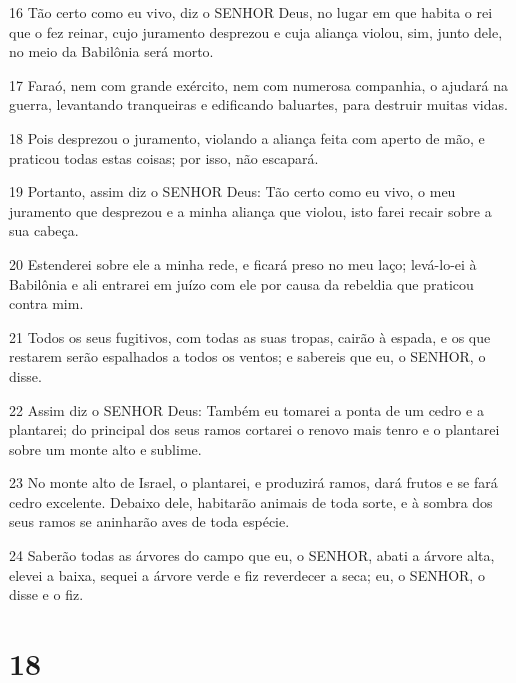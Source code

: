 \par 16 Tão certo como eu vivo, diz o SENHOR Deus, no lugar em que habita o rei que o fez reinar, cujo juramento desprezou e cuja aliança violou, sim, junto dele, no meio da Babilônia será morto.
\par 17 Faraó, nem com grande exército, nem com numerosa companhia, o ajudará na guerra, levantando tranqueiras e edificando baluartes, para destruir muitas vidas.
\par 18 Pois desprezou o juramento, violando a aliança feita com aperto de mão, e praticou todas estas coisas; por isso, não escapará.
\par 19 Portanto, assim diz o SENHOR Deus: Tão certo como eu vivo, o meu juramento que desprezou e a minha aliança que violou, isto farei recair sobre a sua cabeça.
\par 20 Estenderei sobre ele a minha rede, e ficará preso no meu laço; levá-lo-ei à Babilônia e ali entrarei em juízo com ele por causa da rebeldia que praticou contra mim.
\par 21 Todos os seus fugitivos, com todas as suas tropas, cairão à espada, e os que restarem serão espalhados a todos os ventos; e sabereis que eu, o SENHOR, o disse.
\par 22 Assim diz o SENHOR Deus: Também eu tomarei a ponta de um cedro e a plantarei; do principal dos seus ramos cortarei o renovo mais tenro e o plantarei sobre um monte alto e sublime.
\par 23 No monte alto de Israel, o plantarei, e produzirá ramos, dará frutos e se fará cedro excelente. Debaixo dele, habitarão animais de toda sorte, e à sombra dos seus ramos se aninharão aves de toda espécie.
\par 24 Saberão todas as árvores do campo que eu, o SENHOR, abati a árvore alta, elevei a baixa, sequei a árvore verde e fiz reverdecer a seca; eu, o SENHOR, o disse e o fiz.

\chapter{18}

